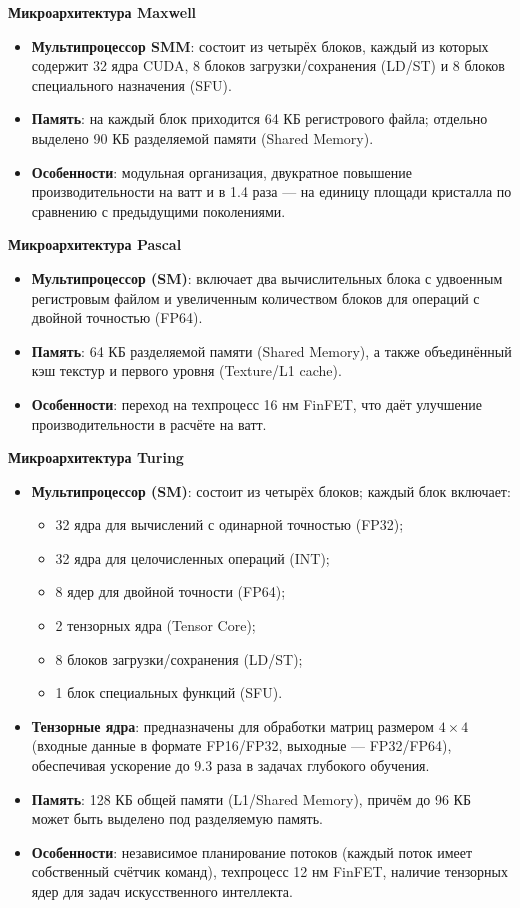 \documentclass{article}[14pt]
\begin{document}
\noindent \textbf{Микроархитектура Maxwell}

\begin{itemize}
\item \textbf{Мультипроцессор SMM}: состоит из четырёх блоков, каждый из которых содержит 32 ядра CUDA, 8 блоков загрузки/сохранения (LD/ST) и 
8 блоков специального назначения (SFU).
\item \textbf{Память}: на каждый блок приходится 64 КБ регистрового файла; отдельно выделено 90 КБ разделяемой памяти (Shared Memory).
\item \textbf{Особенности}: модульная организация, двукратное повышение производительности на ватт и в 1.4 раза — на единицу площади кристалла 
по сравнению с предыдущими поколениями.
\end{itemize}

\noindent \textbf{Микроархитектура Pascal}

\begin{itemize}
\item \textbf{Мультипроцессор (SM)}: включает два вычислительных блока с удвоенным регистровым файлом и увеличенным количеством блоков 
для операций с двойной точностью (FP64).
\item \textbf{Память}: 64 КБ разделяемой памяти (Shared Memory), а также объединённый кэш текстур и первого уровня (Texture/L1 cache).
\item \textbf{Особенности}: переход на техпроцесс 16 нм FinFET, что даёт улучшение производительности в расчёте на ватт.
\end{itemize}

\noindent \textbf{Микроархитектура Turing}

\begin{itemize}
\item \textbf{Мультипроцессор (SM)}: состоит из четырёх блоков; каждый блок включает:
  \begin{itemize}
    \item 32 ядра для вычислений с одинарной точностью (FP32);
    \item 32 ядра для целочисленных операций (INT);
    \item 8 ядер для двойной точности (FP64);
    \item 2 тензорных ядра (Tensor Core);
    \item 8 блоков загрузки/сохранения (LD/ST);
    \item 1 блок специальных функций (SFU).
  \end{itemize}
\item \textbf{Тензорные ядра}: предназначены для обработки матриц размером \(4 \times 4\) (входные данные в формате FP16/FP32, 
выходные — FP32/FP64), обеспечивая ускорение до 9.3 раза в задачах глубокого обучения.
\item \textbf{Память}: 128 КБ общей памяти (L1/Shared Memory), причём до 96 КБ может быть выделено под разделяемую память.
\item \textbf{Особенности}: независимое планирование потоков (каждый поток имеет собственный счётчик команд), техпроцесс 12 нм FinFET, 
наличие тензорных ядер для задач искусственного интеллекта.
\end{itemize}
\end{document}
